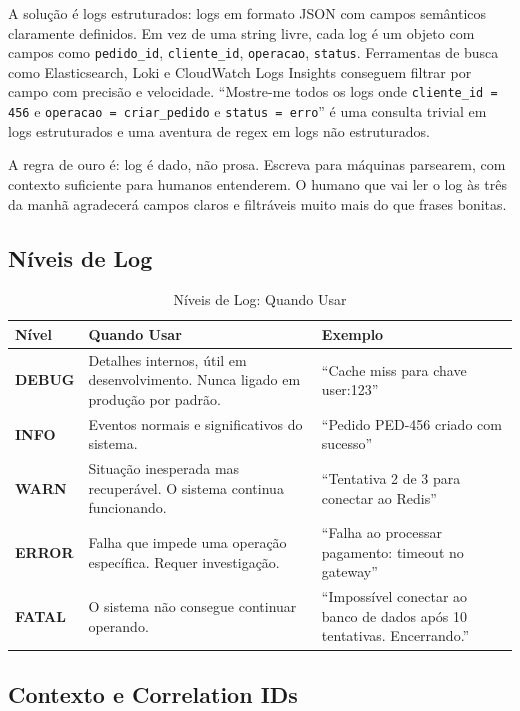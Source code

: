 A solução é logs estruturados: logs em formato JSON com campos semânticos
claramente definidos. Em vez de uma string livre, cada log é um objeto com campos
como \texttt{pedido\_id}, \texttt{cliente\_id}, \texttt{operacao}, \texttt{status}.
Ferramentas de busca como Elasticsearch, Loki e CloudWatch Logs Insights conseguem
filtrar por campo com precisão e velocidade. ``Mostre-me todos os logs onde
\texttt{cliente\_id = 456} e \texttt{operacao = criar\_pedido} e
\texttt{status = erro}'' é uma consulta trivial em logs estruturados e uma
aventura de regex em logs não estruturados.

A regra de ouro é: log é dado, não prosa. Escreva para máquinas parsearem, com
contexto suficiente para humanos entenderem. O humano que vai ler o log às três
da manhã agradecerá campos claros e filtráveis muito mais do que frases bonitas.

\subsection{Níveis de Log}

\begin{table}[h]
\centering
\caption{Níveis de Log: Quando Usar}
\begin{tabular}{>{\bfseries}p{2cm} p{5cm} p{5cm}}
\toprule
Nível & Quando Usar & Exemplo \\
\midrule
DEBUG & Detalhes internos, útil em desenvolvimento. Nunca ligado em produção
    por padrão. & ``Cache miss para chave user:123'' \\
\addlinespace
INFO & Eventos normais e significativos do sistema. & ``Pedido PED-456 criado
    com sucesso'' \\
\addlinespace
WARN & Situação inesperada mas recuperável. O sistema continua funcionando. &
    ``Tentativa 2 de 3 para conectar ao Redis'' \\
\addlinespace
ERROR & Falha que impede uma operação específica. Requer investigação. &
    ``Falha ao processar pagamento: timeout no gateway'' \\
\addlinespace
FATAL & O sistema não consegue continuar operando. & ``Impossível conectar ao
    banco de dados após 10 tentativas. Encerrando.'' \\
\bottomrule
\end{tabular}
\end{table}

\subsection{Contexto e Correlation IDs}

